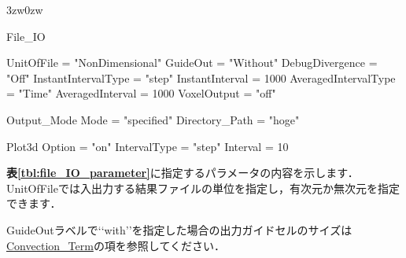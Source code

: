 \begin{indentation}{3zw}{0zw}

{\small
\begin{program}
  File_IO {
    UnitOfFile           = "NonDimensional"
    GuideOut             = "Without"
    DebugDivergence      = "Off"
    InstantIntervalType  = "step"
    InstantInterval      = 1000
    AveragedIntervalType = "Time"
    AveragedInterval     = 1000
    VoxelOutput          = "off"
    
    Output_Mode {
      Mode               = "specified"
      Directory_Path     = "hoge"
    }
    
    Plot3d {
      Option             = "on"
      IntervalType       = "step"
      Interval           = 10
    }
  }
\end{program}
}

\textbf{表\ref{tbl:file_IO_parameter}}に指定するパラメータの内容を示します．
UnitOfFileでは入出力する結果ファイルの単位を指定し，有次元か無次元を指定できます．

GuideOutラベルで\lq\lq with\rq\rq を指定した場合の出力ガイドセルのサイズは\hyperlink{tgt:convection_term}{Convection\_Term}の項を参照してください．



\end{indentation}
